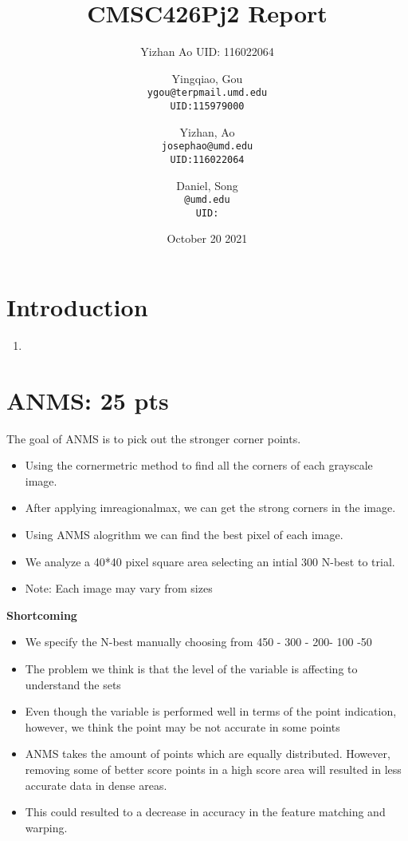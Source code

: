 \documentclass{article}
\title{CMSC426Pj2 Report}
\author{Yizhan Ao UID: 116022064}
\author{
  Yingqiao, Gou\\
  \texttt{ygou@terpmail.umd.edu}\\
  \texttt{UID:115979000}
  \and
  Yizhan, Ao\\
  \texttt{josephao@umd.edu}\\
  \texttt{UID:116022064}
  \and
  Daniel, Song\\
  \texttt{@umd.edu}\\
  \texttt{UID:}
}
\date{October 20 2021}
\begin{document}
\maketitle

\section{Introduction}
\begin{enumerate}
   \item 
\end{enumerate}

\section{ANMS: 25 pts}
The goal of ANMS is to pick out the stronger corner points.\\
\begin{itemize}
    \item Using the cornermetric method to find all the corners of each grayscale image. 
    \item After applying imreagionalmax, we can get the strong corners in the image.
    \item Using ANMS alogrithm we can find the best pixel of each image.
    \item We analyze a 40*40 pixel square area selecting an intial 300 N-best to trial.
    \item Note: Each image may vary from sizes
\end{itemize}
\textbf{Shortcoming} 
\begin{itemize}
    \item We specify the N-best manually choosing from 450 - 300 - 200- 100 -50
    \item The problem we think is that the level of the variable is affecting to understand the sets
    \item Even though the variable is performed well in terms of the point indication, however, we think the point may be not accurate in some points
    \item ANMS takes the amount of points which are equally distributed. However, removing some of better score points in a high score area will resulted in less accurate data in dense areas. 
    \item This could resulted to a decrease in accuracy in the feature matching and warping.

\end{itemize}
\end{document}

